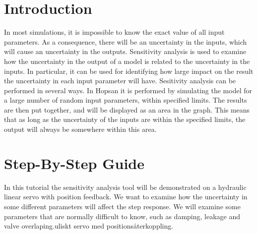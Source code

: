 \documentclass[a4paper,pdftex]{article}
\begin{document}

\section*{Introduction}
In most simulations, it is impossible to know the exact value of all input parameters. 
As a consequence, there will be an uncertainty in the inputs, which will cause an uncertainty in the outputs. 
Sensitivity analysis is used to examine how the uncertainty in the output of a model is related to the uncertainty in the inputs.
In particular, it can be used for identifying how large impact on the result the uncertainty in each input parameter will have.
Sesitivity analysis can be performed in several ways.
In Hopsan it is performed by simulating the model for a large number of random input parameters, within specified limits. 
The results are then put together, and will be displayed as an area in the graph. 
This means that as long as the uncertainty of the inputs are within the specified limits, the output will always be somewhere within this area.

\section*{Step-By-Step Guide}
In this tutorial the sensitivity analysis tool will be demonstrated on a hydraulic linear servo with position feedback. We want to examine how the uncertainty in some different parameters will affect the step response. We will examine some parameters that are normally difficult to know, such as damping, leakage and valve overlaping.uliskt servo med positionsåterkoppling.
\end{document}

